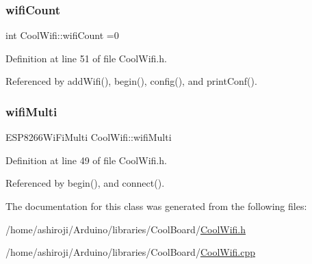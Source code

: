 \subsubsection{\texorpdfstring{wifi\+Count}{wifiCount}}
{\footnotesize\ttfamily int Cool\+Wifi\+::wifi\+Count =0\hspace{0.3cm}{\ttfamily [private]}}



Definition at line 51 of file Cool\+Wifi.\+h.



Referenced by add\+Wifi(), begin(), config(), and print\+Conf().

\mbox{\label{classCoolWifi_a7862a8c0d7239877e2956c14a368aab8}} 
\subsubsection{\texorpdfstring{wifi\+Multi}{wifiMulti}}
{\footnotesize\ttfamily E\+S\+P8266\+Wi\+Fi\+Multi Cool\+Wifi\+::wifi\+Multi\hspace{0.3cm}{\ttfamily [private]}}



Definition at line 49 of file Cool\+Wifi.\+h.



Referenced by begin(), and connect().



The documentation for this class was generated from the following files\+:\begin{DoxyCompactItemize}
\item 
/home/ashiroji/\+Arduino/libraries/\+Cool\+Board/\hyperlink{CoolWifi_8h}{Cool\+Wifi.\+h}\item 
/home/ashiroji/\+Arduino/libraries/\+Cool\+Board/\hyperlink{CoolWifi_8cpp}{Cool\+Wifi.\+cpp}\end{DoxyCompactItemize}
